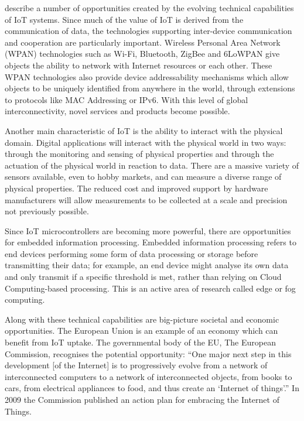    \citet{fromIoC} describe a number of opportunities created by the evolving technical capabilities of IoT systems. Since much of the value of IoT is derived from the communication of data, the technologies supporting inter-device communication and cooperation are particularly important. Wireless Personal Area Network (WPAN) technologies such as Wi-Fi, Bluetooth, ZigBee and 6LoWPAN give objects the ability to network with Internet resources or each other. These WPAN technologies also provide device addressability mechanisms which allow objects to be uniquely identified from anywhere in the world, through extensions to protocols like MAC Addressing or IPv6. With this level of global interconnectivity, novel services and products become possible.

    Another main characteristic of IoT is the ability to interact with the physical domain. Digital applications will interact with the physical world in two ways: through the monitoring and sensing of physical properties and through the actuation of the physical world in reaction to data. There are a massive variety of sensors available, even to hobby markets, and can measure a diverse range of physical properties. The reduced cost and improved support by hardware manufacturers will allow measurements to be collected at a scale and precision not previously possible.

    Since IoT microcontrollers are becoming more powerful, there are opportunities for embedded information processing. Embedded information processing refers to end devices performing some form of data processing or storage before transmitting their data; for example, an end device might analyse its own data and only transmit if a specific threshold is met, rather than relying on Cloud Computing-based processing. This is an active area of research called edge or fog computing.

    Along with these technical capabilities are big-picture societal and economic opportunities. The European Union is an example of an economy which can benefit from IoT uptake. The governmental body of the EU, The European Commission, recognises the potential opportunity: ``One major next step in this development [of the Internet] is to progressively evolve from a network of interconnected computers to a network of interconnected objects, from books to cars, from electrical appliances to food, and thus create an ‘Internet of things’.'' In 2009 the Commission published an action plan for embracing the Internet of Things.

